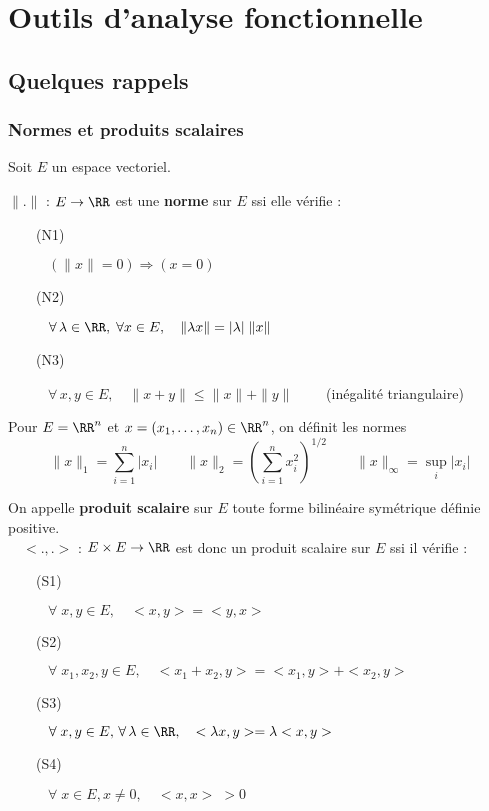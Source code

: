 \chapter{Outils d'analyse fonctionnelle}
%
%
\section{Quelques rappels}
%
\subsection{Normes et produits scalaires}
%
\noindent
Soit $E$ un espace vectoriel.\\
%
\begin{definition}
  \label{def:7}
  $\|.\|$ : $E \rightarrow \RR$ est une {\bf norme} sur $E$ ssi elle v\'erifie :
  \begin{description}
  \item[$\qquad$(N1)] $\left( \| x \| = 0 \right)  \Longrightarrow (x=0)$
  \item[$\qquad$(N2)] $\forall\, \lambda\in\RR,\; \forall x\in E, \quad \| \lambda x \|  = |\lambda| \; \| x \| $
  \item[$\qquad$(N3)] $\forall\,  x,y \in E, \quad \| x+ y \| \le \|x \| + \|y\|\qquad$ (in\'egalit\'e triangulaire)
    \\
  \end{description}
\end{definition}


%
%
\begin{example}
Pour $E=\RR^n$ et $x=(x_1,\ldots,x_n) \in\RR^n$, on d\'efinit les normes
$$
\| x \|_1 = \sum_{i=1}^n |x_i|
\qquad
\| x \|_2 = \left( \sum_{i=1}^n x_i^2 \right)^{1/2}
\qquad
\| x \|_\infty = \sup_{i} |x_i|
$$
\end{example}

%

%
%
%
\begin{definition}
  On appelle {\bf produit scalaire} sur $E$ toute forme bilin\'eaire sym\'etrique d\'efinie positive.\\
  $\quad<.,.>$ : $E\times E \rightarrow \RR$ est donc un produit scalaire sur
  $E$ ssi il v\'erifie :
  \begin{description}
  \item[$\qquad$(S1)] $\forall\; x,y \in E, \quad <x,y> = <y,x>$
  \item[$\qquad$(S2)] $\forall\; x_1,x_2,y \in E, \quad <x_1+x_2,y> = <x_1,y>
    + <x_2,y> $
  \item[$\qquad$(S3)] $\forall\; x,y \in E, \, \forall\, \lambda\in\RR,\quad
    <\lambda x,y> = \lambda <x,y> $
  \item[$\qquad$(S4)] $\forall\;  x \in E, x\ne 0, \quad  <x,x>\; > 0 $\\
  \end{description}
  \label{def:8}
\end{definition}

